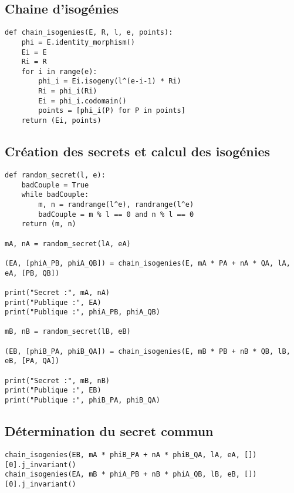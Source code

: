 \documentclass{article}
\theoremstyle{plain}%
\theoremstyle{definition}%
\begin{document}
\subsection*{Chaine d'isogénies}
\begin{verbatim}
def chain_isogenies(E, R, l, e, points):
    phi = E.identity_morphism()
    Ei = E
    Ri = R
    for i in range(e):
        phi_i = Ei.isogeny(l^(e-i-1) * Ri)
        Ri = phi_i(Ri)
        Ei = phi_i.codomain()
        points = [phi_i(P) for P in points]
    return (Ei, points)
\end{verbatim}


\subsection*{Création des secrets et calcul des isogénies}
\begin{verbatim}
def random_secret(l, e):
    badCouple = True
    while badCouple:
        m, n = randrange(l^e), randrange(l^e)
        badCouple = m % l == 0 and n % l == 0
    return (m, n)

mA, nA = random_secret(lA, eA)

(EA, [phiA_PB, phiA_QB]) = chain_isogenies(E, mA * PA + nA * QA, lA, eA, [PB, QB])

print("Secret :", mA, nA)
print("Publique :", EA)
print("Publique :", phiA_PB, phiA_QB)

mB, nB = random_secret(lB, eB)

(EB, [phiB_PA, phiB_QA]) = chain_isogenies(E, mB * PB + nB * QB, lB, eB, [PA, QA])

print("Secret :", mB, nB)
print("Publique :", EB)
print("Publique :", phiB_PA, phiB_QA)
\end{verbatim}


\subsection*{Détermination du secret commun}
\begin{verbatim}
chain_isogenies(EB, mA * phiB_PA + nA * phiB_QA, lA, eA, [])[0].j_invariant()
chain_isogenies(EA, mB * phiA_PB + nB * phiA_QB, lB, eB, [])[0].j_invariant()
\end{verbatim}
\end{document}
